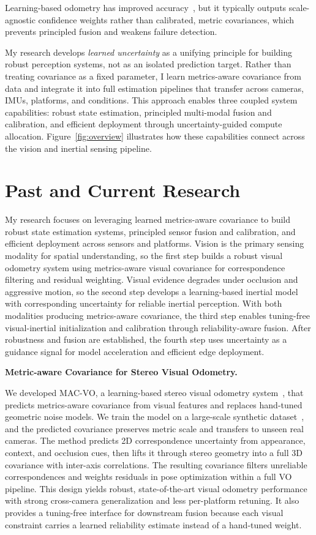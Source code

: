 \documentclass[conference]{IEEEtran}
\begin{document}
Learning-based odometry has improved accuracy~\cite{teed2021droid}, but it typically outputs scale-agnostic confidence weights rather than calibrated, metric covariances, which prevents principled fusion and weakens failure detection.

My research develops \textit{learned uncertainty} as a unifying principle for building robust perception systems, not as an isolated prediction target.
Rather than treating covariance as a fixed parameter, I learn metrics-aware covariance from data and integrate it into full estimation pipelines that transfer across cameras, IMUs, platforms, and conditions.
This approach enables three coupled system capabilities: robust state estimation, principled multi-modal fusion and calibration, and efficient deployment through uncertainty-guided compute allocation.
Figure~\ref{fig:overview} illustrates how these capabilities connect across the vision and inertial sensing pipeline.

\section{Past and Current Research}
My research focuses on leveraging learned metrics-aware covariance to build robust state estimation systems, principled sensor fusion and calibration, and efficient deployment across sensors and platforms.
Vision is the primary sensing modality for spatial understanding, so the first step builds a robust visual odometry system using metrics-aware visual covariance for correspondence filtering and residual weighting.
Visual evidence degrades under occlusion and aggressive motion, so the second step develops a learning-based inertial model with corresponding uncertainty for reliable inertial perception.
With both modalities producing metrics-aware covariance, the third step enables tuning-free visual-inertial initialization and calibration through reliability-aware fusion.
After robustness and fusion are established, the fourth step uses uncertainty as a guidance signal for model acceleration and efficient edge deployment.

\medskip
\noindent\textbf{Metric-aware Covariance for Stereo Visual Odometry.}

We developed MAC-VO, a learning-based stereo visual odometry system~\cite{anonymous2025macvo}, that predicts metrics-aware covariance from visual features and replaces hand-tuned geometric noise models.
We train the model on a large-scale synthetic dataset~\cite{anonymous2020tartanair}, and the predicted covariance preserves metric scale and transfers to unseen real cameras.
The method predicts 2D correspondence uncertainty from appearance, context, and occlusion cues, then lifts it through stereo geometry into a full 3D covariance with inter-axis correlations.
The resulting covariance filters unreliable correspondences and weights residuals in pose optimization within a full VO pipeline.
This design yields robust, state-of-the-art visual odometry performance with strong cross-camera generalization and less per-platform retuning.
It also provides a tuning-free interface for downstream fusion because each visual constraint carries a learned reliability estimate instead of a hand-tuned weight.
\end{document}
